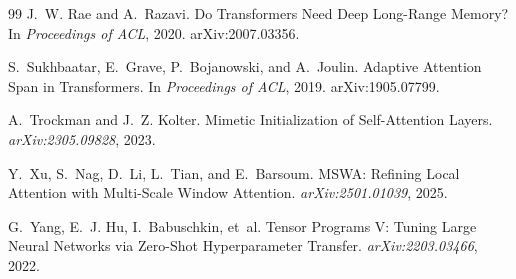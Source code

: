 \documentclass[11pt,a4paper]{article}
\begin{document}
\begin{thebibliography}{99}
J.~W. Rae and A.~Razavi.
\newblock Do Transformers Need Deep Long-Range Memory?
\newblock In \emph{Proceedings of ACL}, 2020. arXiv:2007.03356.

S.~Sukhbaatar, E.~Grave, P.~Bojanowski, and A.~Joulin.
\newblock Adaptive Attention Span in Transformers.
\newblock In \emph{Proceedings of ACL}, 2019. arXiv:1905.07799.

A.~Trockman and J.~Z. Kolter.
\newblock Mimetic Initialization of Self-Attention Layers.
\newblock \emph{arXiv:2305.09828}, 2023.

Y.~Xu, S.~Nag, D.~Li, L.~Tian, and E.~Barsoum.
\newblock MSWA: Refining Local Attention with Multi-Scale Window Attention.
\newblock \emph{arXiv:2501.01039}, 2025.

G.~Yang, E.~J. Hu, I.~Babuschkin, et~al.
\newblock Tensor Programs V: Tuning Large Neural Networks via Zero-Shot Hyperparameter Transfer.
\newblock \emph{arXiv:2203.03466}, 2022.

\end{thebibliography}
\end{document}
